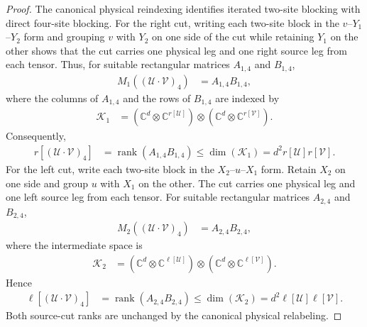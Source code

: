 \begin{proof}\leanok
    The canonical physical reindexing identifies iterated two-site
    blocking with direct four-site blocking. For the right cut, writing each
    two-site block in the $v$--$Y_1$--$Y_2$ form and grouping $v$ with $Y_2$ on one
    side of the cut while retaining $Y_1$ on the other shows that the cut carries
    one physical leg and one right source leg from each tensor. Thus, for
    suitable rectangular matrices $A_{1,4}$ and $B_{1,4}$,
    \begin{align}
        M_1((\mathcal U\mathbin{\cdot}\mathcal V)_4) & =A_{1,4}B_{1,4},
    \end{align}
    where the columns of $A_{1,4}$ and the rows of $B_{1,4}$ are indexed by
    \begin{align}
        \mathcal K_1
         & =(\mathbb C^d\otimes\mathbb C^{r[\mathcal U]})
        \otimes
        (\mathbb C^d\otimes\mathbb C^{r[\mathcal V]}).
    \end{align}
    Consequently,
    \begin{align}
        r[(\mathcal U\mathbin{\cdot}\mathcal V)_4]
         & =\operatorname{rank}(A_{1,4}B_{1,4})
        \leq\dim(\mathcal K_1)
        =d^2r[\mathcal U]r[\mathcal V].
    \end{align}
    For the left cut, write each two-site block in the
    $X_2$--$u$--$X_1$ form. Retain $X_2$ on one side and group $u$ with $X_1$
    on the other. The cut carries one physical leg and one left source leg from
    each tensor. For suitable rectangular matrices $A_{2,4}$ and $B_{2,4}$,
    \begin{align}
        M_2((\mathcal U\mathbin{\cdot}\mathcal V)_4) & =A_{2,4}B_{2,4},
    \end{align}
    where the intermediate space is
    \begin{align}
        \mathcal K_2
         & =(\mathbb C^d\otimes\mathbb C^{\ell[\mathcal U]})
        \otimes
        (\mathbb C^d\otimes\mathbb C^{\ell[\mathcal V]}).
    \end{align}
    Hence
    \begin{align}
        \ell[(\mathcal U\mathbin{\cdot}\mathcal V)_4]
         & =\operatorname{rank}(A_{2,4}B_{2,4})
        \leq\dim(\mathcal K_2)
        =d^2\ell[\mathcal U]\ell[\mathcal V].
    \end{align}
    Both source-cut ranks are unchanged by the canonical physical relabeling.
\end{proof}

